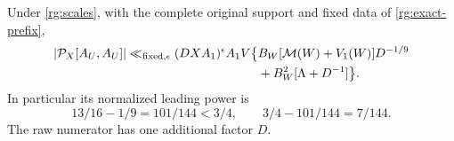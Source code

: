\begin{theorem}\label{rg:prefix-theorem}
Under \eqref{rg:scales}, with the complete original support and fixed
data of \eqref{rg:exact-prefix},
\begin{equation}\label{rg:prefix-bound}
 \begin{split}
 |\mathcal P_X[A_U,A_U]|
 \ll_{\rm fixed,\epsilon}(DXA_1)^\epsilon A_1V
 \bigl\{&
 B_W[\mathcal M(W)+V_1(W)]D^{-1/9}\\
 &+B_W^2[\Lambda+D^{-1}]\bigr\}.
 \end{split}
\end{equation}
In particular its normalized leading power is
\begin{equation}\label{rg:critical-power}
 13/16-1/9=101/144<3/4,\qquad 3/4-101/144=7/144 .
\end{equation}
The raw numerator has one additional factor \(D\).
\end{theorem}
